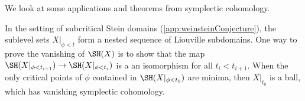 
We look at some applications and theorems from symplectic cohomology. 





In the setting of subcritical Stein domains (\cref{app:weinsteinConjecture}), the sublevel sets $X|_{\phi< t}$ form a nested sequence of Liouville subdomains. One way to prove the vanishing of $\SH(X)$ is to show that the map $\SH(X|_{\phi< t_{i+1}})\to \SH(X|_{\phi< t_{i}})$ is a an isomorphism for all $t_{i} < t_{i+1}$. When the only critical points of $\phi$ contained in $\SH(X|_{\phi < t_0})$ are minima, then $X|_{t_0}$ is a ball, which has vanishing symplectic cohomology.
